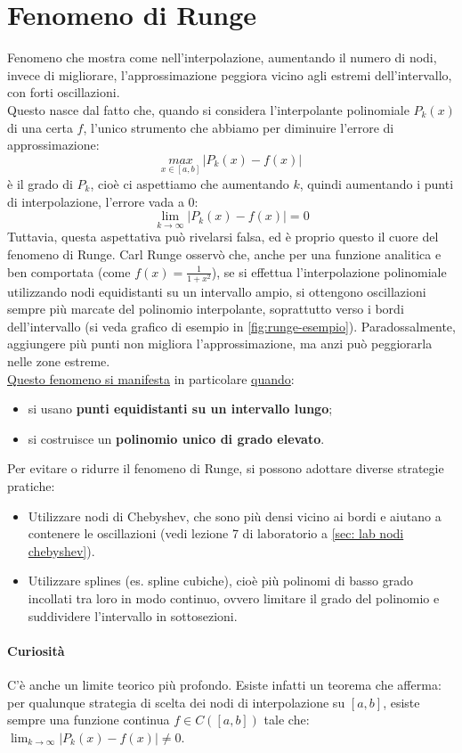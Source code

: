 \documentclass[12pt,a4paper,]{report}
\begin{document}
\section{Fenomeno di Runge}
Fenomeno che mostra come nell'interpolazione, aumentando il numero di nodi, invece di migliorare, l'approssimazione peggiora vicino agli estremi dell'intervallo, con forti oscillazioni.\\
Questo nasce dal fatto che, quando si considera l'interpolante polinomiale $P_k(x)$ di una certa $f$, l'unico strumento che abbiamo per diminuire l'errore di approssimazione:
\[\underset{x \in [a,b]}{max}\, |P_k(x) - f(x)|\]
è il grado di $P_k$, cioè ci aspettiamo che aumentando $k$, quindi aumentando i punti di interpolazione, l'errore vada a $0$:
\[
\lim_{k \to \infty} |P_k(x) - f(x)| = 0
\]
Tuttavia, questa aspettativa può rivelarsi falsa, ed è proprio questo il cuore del fenomeno di Runge. Carl Runge osservò che, anche per una funzione analitica e ben comportata (come $f(x) = \frac{1}{1 + x^2}$), se si effettua l'interpolazione polinomiale utilizzando nodi equidistanti su un intervallo ampio, si ottengono oscillazioni sempre più marcate del polinomio interpolante, soprattutto verso i bordi dell'intervallo (si veda grafico di esempio in \autoref{fig:runge-esempio}). Paradossalmente, aggiungere più punti non migliora l'approssimazione, ma anzi può peggiorarla nelle zone estreme.\\
\uline{Questo fenomeno si manifesta} in particolare \uline{quando}:
\begin{itemize}
    \item si usano \textbf{punti equidistanti su un intervallo lungo};
    \item si costruisce un \textbf{polinomio unico di grado elevato}.
\end{itemize}
Per evitare o ridurre il fenomeno di Runge, si possono adottare diverse strategie pratiche:
\begin{itemize}
    \item Utilizzare nodi di Chebyshev, che sono più densi vicino ai bordi e aiutano a contenere le oscillazioni (vedi lezione 7 di laboratorio a \autoref{sec: lab nodi chebyshev}).
    \item Utilizzare splines (es. spline cubiche), cioè più polinomi di basso grado incollati tra loro in modo continuo, ovvero limitare il grado del polinomio e suddividere l'intervallo in sottosezioni.
\end{itemize}
\paragraph{Curiosità}
C'è anche un limite teorico più profondo. Esiste infatti un teorema che afferma: per qualunque strategia di scelta dei nodi di interpolazione su $[a, b]$, esiste sempre una funzione continua $f \in C([a, b])$ tale che: $\lim_{k \to \infty} |P_k(x) - f(x)| \neq 0$.
\end{document}
